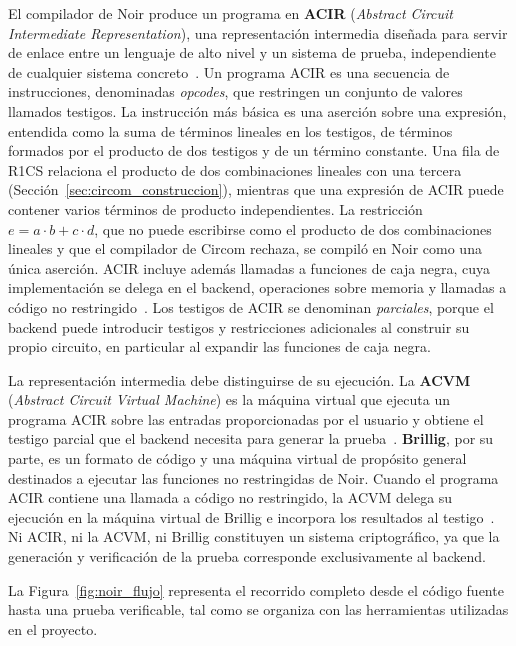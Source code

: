 El compilador de Noir produce un programa en \textbf{ACIR} (\textit{Abstract Circuit
Intermediate Representation}), una representación intermedia diseñada para servir de enlace
entre un lenguaje de alto nivel y un sistema de prueba, independiente de cualquier sistema
concreto~\cite{noirrepo}. Un programa ACIR es una secuencia de instrucciones, denominadas
\textit{opcodes}, que restringen un conjunto de valores llamados testigos. La instrucción más
básica es una aserción sobre una expresión, entendida como la suma de términos lineales en los
testigos, de términos formados por el producto de dos testigos y de un término constante. Una
fila de R1CS relaciona el producto de dos combinaciones lineales con una tercera
(Sección~\ref{sec:circom_construccion}), mientras que una expresión de ACIR puede contener varios
términos de producto independientes. La restricción $e = a \cdot b + c \cdot d$, que no puede
escribirse como el producto de dos combinaciones lineales y que el compilador de Circom rechaza,
se compiló en Noir como una única aserción. ACIR incluye además llamadas a funciones de
caja negra, cuya implementación se delega en el backend, operaciones sobre memoria y llamadas a
código no restringido~\cite{noirrepo, noirdocsbeta}. Los testigos de ACIR se denominan
\textit{parciales}, porque el backend puede introducir testigos y restricciones adicionales al
construir su propio circuito, en particular al expandir las funciones de caja negra.

La representación intermedia debe distinguirse de su ejecución. La \textbf{ACVM}
(\textit{Abstract Circuit Virtual Machine}) es la máquina virtual que ejecuta un programa ACIR
sobre las entradas proporcionadas por el usuario y obtiene el testigo parcial que el backend
necesita para generar la prueba~\cite{noirrepo}. \textbf{Brillig}, por su parte, es un formato de
código y una máquina virtual de propósito general destinados a ejecutar las funciones no
restringidas de Noir. Cuando el programa ACIR contiene una llamada a código no restringido, la
ACVM delega su ejecución en la máquina virtual de Brillig e incorpora los resultados al
testigo~\cite{noirrepo}. Ni ACIR, ni la ACVM, ni Brillig constituyen un sistema criptográfico, ya
que la generación y verificación de la prueba corresponde exclusivamente al backend.

La Figura~\ref{fig:noir_flujo} representa el recorrido completo desde el código fuente hasta una
prueba verificable, tal como se organiza con las herramientas utilizadas en el proyecto.

